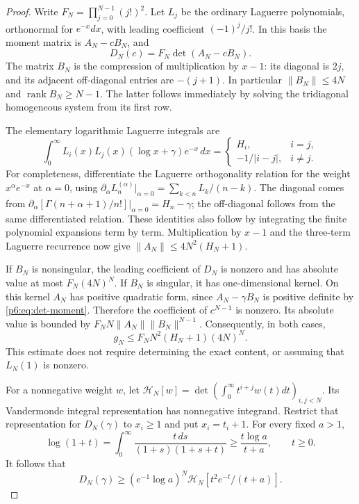 \documentclass[11pt,a4paper]{article}
\theoremstyle{definition}
\theoremstyle{remark}
\numberwithin{equation}{section}
\begin{document}
\begin{proof}
Write $F_N=\prod_{j=0}^{N-1}(j!)^2$.  Let $L_j$ be the ordinary
Laguerre polynomials, orthonormal for $e^{-x}dx$, with leading
coefficient $(-1)^j/j!$.  In this basis the moment matrix is
$A_N-cB_N$, and
\begin{equation}\label{p6:eq:det-basis}
 D_N(c)=F_N\det(A_N-cB_N).
\end{equation}
The matrix $B_N$ is the compression of multiplication by $x-1$:
its diagonal is $2j$, and its adjacent off-diagonal entries are
$-(j+1)$.  In particular $\|B_N\|\leq4N$ and
$\operatorname{rank}B_N\geq N-1$.  The latter follows immediately
by solving the tridiagonal homogeneous system from its first row.

The elementary logarithmic Laguerre integrals are
\begin{equation}\label{p6:eq:det-loglag}
 \int_0^\infty L_i(x)L_j(x)(\log x+\gamma)e^{-x}\,dx
 =\begin{cases}H_i,&i=j,\\-1/|i-j|,&i\ne j.\end{cases}
\end{equation}
For completeness, differentiate the Laguerre orthogonality relation
for the weight $x^\alpha e^{-x}$ at $\alpha=0$, using
$\partial_\alpha L_n^{(\alpha)}|_{\alpha=0}
=\sum_{k<n}L_k/(n-k)$.  The diagonal comes from
$\partial_\alpha[\Gamma(n+\alpha+1)/n!]|_{\alpha=0}=H_n-\gamma$;
the off-diagonal follows from the same differentiated relation.
These identities also follow by integrating the finite polynomial
expansions term by term.
Multiplication by $x-1$ and the three-term Laguerre recurrence now
give $\|A_N\|\leq4N^2(H_N+1)$.

If $B_N$ is nonsingular, the leading coefficient of $D_N$ is nonzero
and has absolute value at most $F_N(4N)^N$.  If $B_N$ is singular,
it has one-dimensional kernel.  On this kernel $A_N$ has positive
quadratic form, since $A_N-\gamma B_N$ is positive definite by
\eqref{p6:eq:det-moment}.  Therefore the coefficient of $c^{N-1}$ is
nonzero.  Its absolute value is bounded by
$F_N N\|A_N\|\|B_N\|^{N-1}$.  Consequently, in both cases,
\begin{equation}\label{p6:eq:det-content}
 g_N\leq F_N N^2(H_N+1)(4N)^N.
\end{equation}
This estimate does not require determining the exact content, or
assuming that $L_N(1)$ is nonzero.

For a nonnegative weight $w$, let
$\mathcal H_N[w]=\det(\int_0^\infty t^{i+j}w(t)dt)_{i,j<N}$.
Its Vandermonde integral representation has nonnegative integrand.
Restrict that representation for $D_N(\gamma)$ to $x_i\geq1$ and
put $x_i=t_i+1$.  For every fixed $a>1$,
\[
 \log(1+t)=\int_0^\infty
       \frac{t\,ds}{(1+s)(1+s+t)}
 \geq \frac{t\log a}{t+a},\qquad t\geq0.
\]
It follows that
\begin{equation}\label{p6:eq:det-lower-weight}
 D_N(\gamma)\geq(e^{-1}\log a)^N
     \mathcal H_N[t^2e^{-t}/(t+a)].
\end{equation}


\end{proof}
\end{document}
